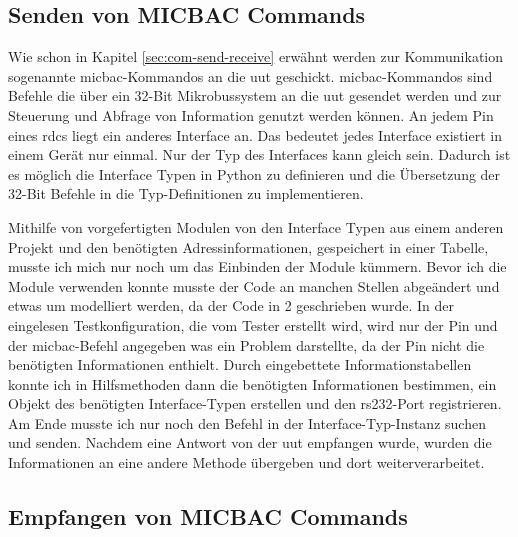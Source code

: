 \subsection{Senden von MICBAC Commands}
\label{subsec:send-micbac}

Wie schon in Kapitel \ref{sec:com-send-receive} erwähnt werden zur Kommunikation sogenannte \ac{micbac}-Kommandos an die \ac{uut} geschickt. \ac{micbac}-Kommandos sind Befehle die über ein 32-Bit Mikrobussystem an die \ac{uut} gesendet werden und zur Steuerung und Abfrage von Information genutzt werden können. An jedem Pin eines \ac{rdc}s liegt ein anderes Interface an. Das bedeutet jedes Interface existiert in einem Gerät nur einmal. Nur der Typ des Interfaces kann gleich sein. Dadurch ist es möglich die Interface Typen in Python zu definieren und die Übersetzung der 32-Bit Befehle in die Typ-Definitionen zu implementieren.


Mithilfe von vorgefertigten Modulen von den Interface Typen aus einem anderen Projekt und den benötigten Adressinformationen, gespeichert in einer Tabelle, musste ich mich nur noch um das Einbinden der Module kümmern. Bevor ich die Module verwenden konnte musste der Code an manchen Stellen abgeändert und etwas um modelliert werden, da der Code in  2 geschrieben wurde. In der eingelesen Testkonfiguration, die vom Tester erstellt wird, wird nur der Pin und der \ac{micbac}-Befehl angegeben was ein Problem darstellte, da der Pin nicht die benötigten Informationen enthielt. Durch  eingebettete Informationstabellen konnte ich in Hilfsmethoden dann die benötigten Informationen bestimmen, ein Objekt des benötigten Interface-Typen erstellen und den \ac{rs232}-Port registrieren. Am Ende musste ich nur noch den Befehl in der Interface-Typ-Instanz suchen und senden. Nachdem eine Antwort von der \ac{uut} empfangen wurde, wurden die Informationen an eine andere Methode übergeben und dort weiterverarbeitet.

\subsection{Empfangen von MICBAC Commands}
\label{subsec:receive-micbac}


